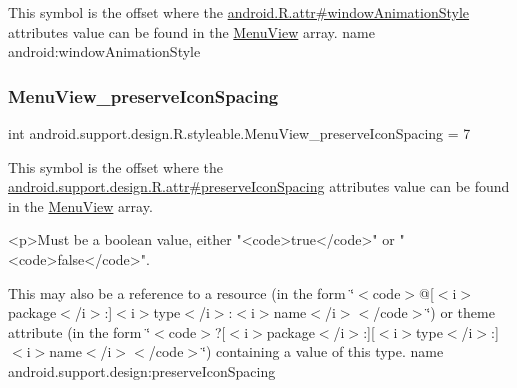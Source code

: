 This symbol is the offset where the \hyperlink{}{android.\+R.\+attr\#window\+Animation\+Style} attribute\textquotesingle{}s value can be found in the \hyperlink{classandroid_1_1support_1_1design_1_1R_1_1styleable_acaf80b4eb554eab1b6f3b7f929ac7039}{Menu\+View} array.  name android\+:window\+Animation\+Style \mbox{\label{classandroid_1_1support_1_1design_1_1R_1_1styleable_a95328f75cc0262ab91e2f350455b98bc}} 
\subsubsection{\texorpdfstring{Menu\+View\+\_\+preserve\+Icon\+Spacing}{MenuView\_preserveIconSpacing}}
{\footnotesize\ttfamily int android.\+support.\+design.\+R.\+styleable.\+Menu\+View\+\_\+preserve\+Icon\+Spacing = 7\hspace{0.3cm}{\ttfamily [static]}}

This symbol is the offset where the \hyperlink{classandroid_1_1support_1_1design_1_1R_1_1attr_abe8b81391e1e9e0383b96c02187df971}{android.\+support.\+design.\+R.\+attr\#preserve\+Icon\+Spacing} attribute\textquotesingle{}s value can be found in the \hyperlink{classandroid_1_1support_1_1design_1_1R_1_1styleable_acaf80b4eb554eab1b6f3b7f929ac7039}{Menu\+View} array.

\begin{DoxyVerb}      <p>Must be a boolean value, either "<code>true</code>" or "<code>false</code>".
\end{DoxyVerb}
 

This may also be a reference to a resource (in the form \char`\"{}$<$code$>$@\mbox{[}$<$i$>$package$<$/i$>$\+:\mbox{]}$<$i$>$type$<$/i$>$\+:$<$i$>$name$<$/i$>$$<$/code$>$\char`\"{}) or theme attribute (in the form \char`\"{}$<$code$>$?\mbox{[}$<$i$>$package$<$/i$>$\+:\mbox{]}\mbox{[}$<$i$>$type$<$/i$>$\+:\mbox{]}$<$i$>$name$<$/i$>$$<$/code$>$\char`\"{}) containing a value of this type.  name android.\+support.\+design\+:preserve\+Icon\+Spacing \mbox{\label{classandroid_1_1support_1_1design_1_1R_1_1styleable_a277c199f371e8804c26e2cd6dbf88999}} 
